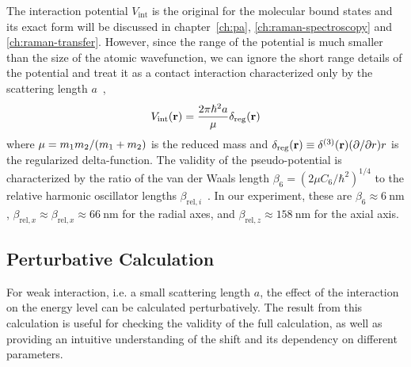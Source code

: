 The interaction potential $V_{\mathrm{int}}$ is the original for
the molecular bound states and its exact form will be discussed in chapter~\ref{ch:pa},
\ref{ch:raman-spectroscopy} and \ref{ch:raman-transfer}.
However, since the range of the potential is much smaller than
the size of the atomic wavefunction, we can ignore the short range details of the potential
and treat it as a contact interaction characterized only by
the scattering length $a$~\cite{busch_two_1998},
\[
  V_{\mathrm{int}}{\left({\mathbf{r}}\right)}=\frac{2\pi\hbar^2a}{\mu}\delta_{\mathrm{reg}}{\left({\mathbf{r}}\right)}
\]
where $\mu = m_1m_2/{\left({m_1+m_2}\right)}$ is the reduced mass and
$\delta_{\mathrm{reg}}{\left({\mathbf{r}}\right)}\equiv\delta^{(3)}{\left({\mathbf{r}}\right)}{\left({\partial/\partial r}\right)}r$
is the regularized delta-function.
The validity of the pseudo-potential is characterized by the ratio of
the van der Waals length $\beta_6 = (2\mu C_6 / \hbar^2)^{1/4}$
to the relative harmonic oscillator lengths $\beta_{\mathrm{rel},i}$~\cite{
  bolda_effective-scattering-length_2002,blume_fermi_2002}.
In our experiment, these are $\beta_6 \approx 6~\mathrm{nm}$,
$\beta_{\mathrm{rel},x} \approx \beta_{\mathrm{rel},x}\approx 66~\mathrm{nm}$ for the radial axes,
and  $\beta_{\mathrm{rel},z} \approx 158~\mathrm{nm}$ for the axial axis.

\subsection{Perturbative Calculation}
\label{ch:interaction-shift:theory:perturb}

For weak interaction, i.e. a small scattering length $a$, the effect of the interaction
on the energy level can be calculated perturbatively.
The result from this calculation is useful for checking the validity of the full calculation,
as well as providing an intuitive understanding of the shift and its dependency
on different parameters.

